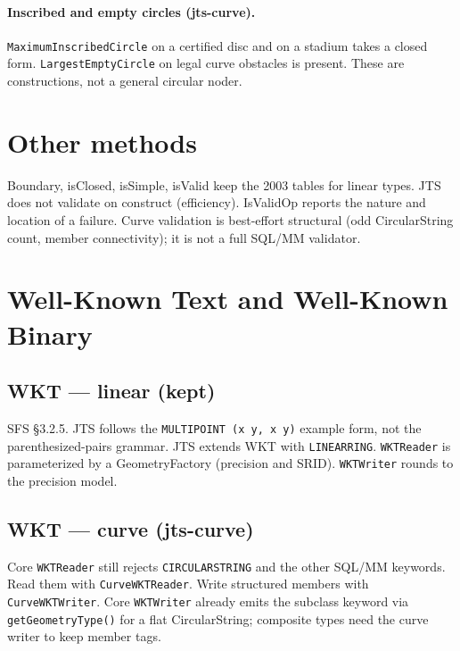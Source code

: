 \documentclass[11pt]{article}
\begin{document}
\paragraph{Inscribed and empty circles (jts-curve).}
\texttt{MaximumInscribedCircle} on a certified disc and on a stadium
takes a closed form. \texttt{LargestEmptyCircle} on legal curve
obstacles is present. These are constructions, not a general
circular noder.


\section{Other methods}
Boundary, isClosed, isSimple, isValid keep the 2003 tables for
linear types. JTS does not validate on construct (efficiency).
IsValidOp reports the nature and location of a failure. Curve
validation is best-effort structural (odd CircularString count,
member connectivity); it is not a full SQL/MM validator.

\section{Well-Known Text and Well-Known Binary}

\subsection{WKT --- linear (kept)}
SFS \S3.2.5. JTS follows the \texttt{MULTIPOINT (x y, x y)} example
form, not the parenthesized-pairs grammar. JTS extends WKT with
\texttt{LINEARRING}. \texttt{WKTReader} is parameterized by a
GeometryFactory (precision and SRID). \texttt{WKTWriter} rounds to
the precision model.

\subsection{WKT --- curve (jts-curve)}
Core \texttt{WKTReader} still rejects \texttt{CIRCULARSTRING} and
the other SQL/MM keywords. Read them with \texttt{CurveWKTReader}.
Write structured members with \texttt{CurveWKTWriter}. Core
\texttt{WKTWriter} already emits the subclass keyword via
\texttt{getGeometryType()} for a flat CircularString; composite
types need the curve writer to keep member tags.
\end{document}
